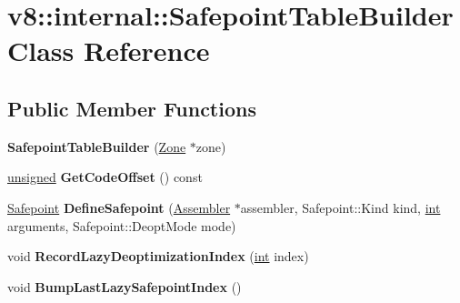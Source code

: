 \hypertarget{classv8_1_1internal_1_1SafepointTableBuilder}{}\section{v8\+:\+:internal\+:\+:Safepoint\+Table\+Builder Class Reference}
\label{classv8_1_1internal_1_1SafepointTableBuilder}
\subsection*{Public Member Functions}
\begin{DoxyCompactItemize}
\item 
\mbox{\label{classv8_1_1internal_1_1SafepointTableBuilder_ab0a292835bce588fe0c4602504cdc1ad}} 
{\bfseries Safepoint\+Table\+Builder} (\mbox{\hyperlink{classv8_1_1internal_1_1Zone}{Zone}} $\ast$zone)
\item 
\mbox{\label{classv8_1_1internal_1_1SafepointTableBuilder_a4a80f9b8b6d2e04d57e5ab2fba0b4878}} 
\mbox{\hyperlink{classunsigned}{unsigned}} {\bfseries Get\+Code\+Offset} () const
\item 
\mbox{\label{classv8_1_1internal_1_1SafepointTableBuilder_acf2e61d1c6a047afe288b7b2e3b57ebb}} 
\mbox{\hyperlink{classv8_1_1internal_1_1Safepoint}{Safepoint}} {\bfseries Define\+Safepoint} (\mbox{\hyperlink{classv8_1_1internal_1_1Assembler}{Assembler}} $\ast$assembler, Safepoint\+::\+Kind kind, \mbox{\hyperlink{classint}{int}} arguments, Safepoint\+::\+Deopt\+Mode mode)
\item 
\mbox{\label{classv8_1_1internal_1_1SafepointTableBuilder_abb1e6e27a1cc5504a6adae3cbce6f32e}} 
void {\bfseries Record\+Lazy\+Deoptimization\+Index} (\mbox{\hyperlink{classint}{int}} index)
\item 
\mbox{\label{classv8_1_1internal_1_1SafepointTableBuilder_acbc0eff22c056e8198e23331b3f96465}} 
void {\bfseries Bump\+Last\+Lazy\+Safepoint\+Index} ()
\item 
\mbox{\label{classv8_1_1internal_1_1SafepointTableBuilder_a4ec6ed5fb87b280f249ff82349d08cd3}} 

\end{DoxyCompactItemize}
